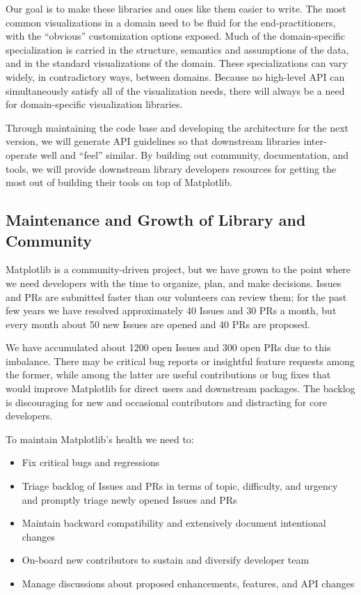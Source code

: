 \documentclass[11pt,letterpaper]{article}  %
\begin{document}
Our goal is to make these libraries and ones like them easier to write. The most common visualizations in a domain need to be fluid for the end-practitioners, with the ``obvious'' customization options exposed. Much of the domain-specific specialization is carried in the structure, semantics and assumptions of the data, and in the standard visualizations of the domain. These specializations can vary widely, in contradictory ways, between domains. Because no high-level API can simultaneously satisfy all of the visualization needs, there will always be a need for domain-specific visualization libraries.

Through maintaining the code base and developing the architecture for the next version, we will generate API guidelines so that downstream libraries inter-operate well and ``feel'' similar. By building out community, documentation, and tools, we will provide downstream library developers resources for getting the most out of building their tools on top of Matplotlib. 

\subsection{Maintenance and Growth of Library and Community}

Matplotlib is a community-driven project, but we have grown to the point where we need developers with the time to organize, plan, and make decisions. Issues and PRs are submitted faster than our volunteers can
review them; for the past few years we have resolved approximately 40 Issues and 30 PRs a month, but every month about 50 new Issues are opened and 40 PRs are proposed.

We have accumulated about 1200 open Issues and 300 open PRs due to this imbalance. There may be critical bug reports or insightful feature requests among the former, while among the latter are useful contributions or bug fixes that would improve Matplotlib for direct users and downstream packages. The backlog is discouraging for new and occasional contributors and distracting for core developers.

To maintain Matplotlib's health we need to:
\begin{itemize}[noitemsep]
\item Fix critical bugs and regressions
\item Triage backlog of Issues and PRs in terms of topic, difficulty, and urgency and promptly triage newly opened Issues and PRs
\item Maintain backward compatibility and extensively document intentional changes
\item On-board new contributors to sustain and diversify developer team
\item Manage discussions about proposed enhancements, features, and API changes
\end{itemize}
\end{document}
